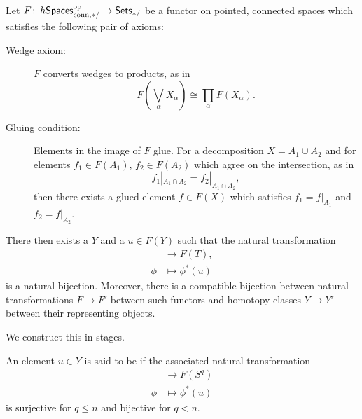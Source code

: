 \begin{theorem}[Brown]\label{BrownRepThm}
Let $F\colon\thinspace h\mathsf{Spaces}^{\mathrm{op}}_{\mathrm{conn}, */} \to \mathsf{Sets}_{*/}$ be a functor on pointed, connected spaces which satisfies the following pair of axioms:
\begin{description}
    \item[Wedge axiom:] $F$ converts wedges to products, as in \[F(\bigvee_\alpha X_\alpha) \cong \prod_\alpha F(X_\alpha).\]
    \item[Gluing condition:] Elements in the image of $F$ glue.
    For a decomposition $X = A_1 \cup A_2$ and for elements $f_1 \in F(A_1)$, $f_2 \in F(A_2)$ which agree on the intersection, as in \[f_1|_{A_1 \cap A_2} = f_2|_{A_1 \cap A_2},\] then there exists a glued element $f \in F(X)$ which satisfies $f_1 = f|_{A_1}$ and $f_2 = f|_{A_2}$.
\end{description}
There then exists a  $Y$ and a  $u \in F(Y)$ such that the natural transformation
\begin{align*}
[T, Y] & \to F(T), \\
\phi & \mapsto \phi^*(u)
\end{align*}
is a natural bijection.
Moreover, there is a compatible bijection between natural transformations $F \to F'$ between such functors and homotopy classes $Y \to Y'$ between their representing objects.
\end{theorem}

\noindent We construct this in stages.

\begin{definition}
An element $u \in Y$ is said to be  if the associated natural transformation
\begin{align*}
[S^q, Y] & \to F(S^q) \\
\phi & \mapsto \phi^*(u)
\end{align*}
is surjective for $q \le n$ and bijective for $q < n$.
\end{definition}

